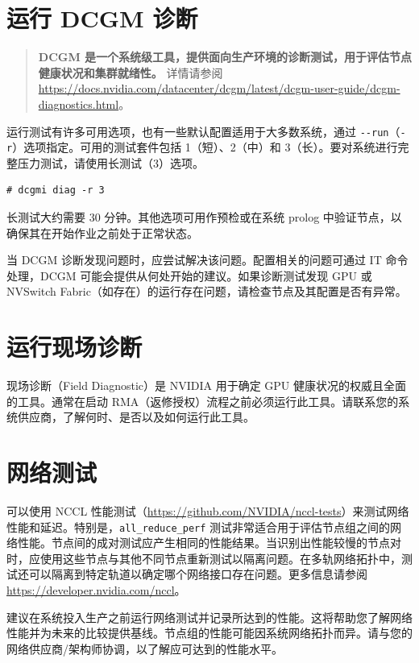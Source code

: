 \documentclass[11pt,UTF8,fontset=fandol,openany]{ctexrep}
\begin{document}
\section{运行 DCGM 诊断}

\begin{quote}
\textbf{DCGM 是一个系统级工具，提供面向生产环境的诊断测试，用于评估节点健康状况和集群就绪性。} 详情请参阅 \url{https://docs.nvidia.com/datacenter/dcgm/latest/dcgm-user-guide/dcgm-diagnostics.html}。
\end{quote}

运行测试有许多可用选项，也有一些默认配置适用于大多数系统，通过 \texttt{-{}-run}（\texttt{-r}）选项指定。可用的测试套件包括 1（短）、2（中）和 3（长）。要对系统进行完整压力测试，请使用长测试（3）选项。

\begin{lstlisting}
# dcgmi diag -r 3
\end{lstlisting}

长测试大约需要 30 分钟。其他选项可用作预检或在系统 prolog 中验证节点，以确保其在开始作业之前处于正常状态。

当 DCGM 诊断发现问题时，应尝试解决该问题。配置相关的问题可通过 IT 命令处理，DCGM 可能会提供从何处开始的建议。如果诊断测试发现 GPU 或 NVSwitch Fabric（如存在）的运行存在问题，请检查节点及其配置是否有异常。

\section{运行现场诊断}

现场诊断（Field Diagnostic）是 NVIDIA 用于确定 GPU 健康状况的权威且全面的工具。通常在启动 RMA（返修授权）流程之前必须运行此工具。请联系您的系统供应商，了解何时、是否以及如何运行此工具。

\section{网络测试}

可以使用 NCCL 性能测试（\url{https://github.com/NVIDIA/nccl-tests}）来测试网络性能和延迟。特别是，\texttt{all\_reduce\_perf} 测试非常适合用于评估节点组之间的网络性能。节点间的成对测试应产生相同的性能结果。当识别出性能较慢的节点对时，应使用这些节点与其他不同节点重新测试以隔离问题。在多轨网络拓扑中，测试还可以隔离到特定轨道以确定哪个网络接口存在问题。更多信息请参阅 \url{https://developer.nvidia.com/nccl}。

建议在系统投入生产之前运行网络测试并记录所达到的性能。这将帮助您了解网络性能并为未来的比较提供基线。节点组的性能可能因系统网络拓扑而异。请与您的网络供应商/架构师协调，以了解应可达到的性能水平。
\end{document}
